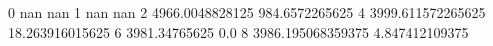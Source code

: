 0 nan nan
1 nan nan
2 4966.0048828125 984.6572265625
4 3999.611572265625 18.263916015625
6 3981.34765625 0.0
8 3986.195068359375 4.847412109375
